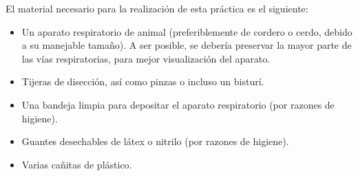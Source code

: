 \documentclass[12pt,a4paper]{article}
\begin{document}
El material necesario para la realización de esta práctica es el siguiente:
\begin{itemize}
	\item Un aparato respiratorio de animal (preferiblemente de cordero o cerdo, debido a su manejable tamaño). A ser posible, se debería preservar la mayor parte de las vías respiratorias, para mejor visualización del aparato.
	\item Tijeras de disección, así como pinzas o incluso un bisturí.
	\item Una bandeja limpia para depositar el aparato respiratorio (por razones de higiene).
	\item Guantes desechables de látex o nitrilo (por razones de higiene).
	\item Varias cañitas de plástico.
\end{itemize}
\end{document}
